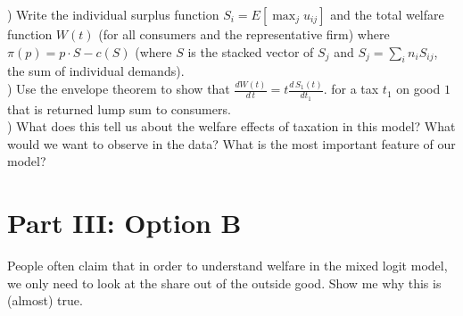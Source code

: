 \documentclass[12pt]{article}
\begin{document}
) Write the individual surplus function $S_i = E[\max_j u_{ij}]$ and the total welfare function $W(t)$ (for all consumers and the representative firm) where $\pi(p) = p \cdot S- c(S)$ (where $S$ is the stacked vector of $S_{j}$ and $S_j = \sum_i n_i S_{ij}$, the sum of individual demands).\\


) Use the envelope theorem to show that $\frac{d W(t)}{d\, t} = t \frac{d\, S_1(t)}{d t_1}$. for a tax $t_1$ on good $1$ that is returned lump sum to consumers.\\

) What does this tell us about the welfare effects of taxation in this model? What would we want to observe in the data? What is the most important feature of our model?

\section*{\normalsize Part III: Option B}
People often claim that in order to understand welfare in the mixed logit model, we only need to look at the share out of the outside good. Show me why this is (almost) true.
\end{document}
